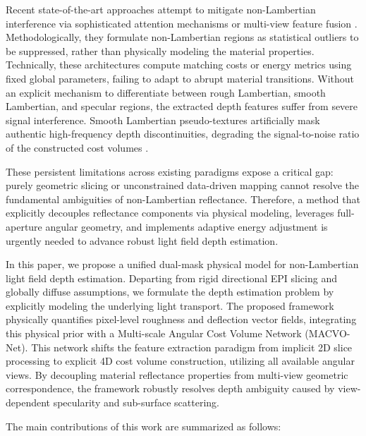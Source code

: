 \documentclass[lettersize,journal]{IEEEtran}
\begin{document}
Recent state-of-the-art approaches attempt to mitigate non-Lambertian interference via sophisticated attention mechanisms or multi-view feature fusion \cite{li2021, peng2022}. Methodologically, they formulate non-Lambertian regions as statistical outliers to be suppressed, rather than physically modeling the material properties. Technically, these architectures compute matching costs or energy metrics using fixed global parameters, failing to adapt to abrupt material transitions. Without an explicit mechanism to differentiate between rough Lambertian, smooth Lambertian, and specular regions, the extracted depth features suffer from severe signal interference. Smooth Lambertian pseudo-textures artificially mask authentic high-frequency depth discontinuities, degrading the signal-to-noise ratio of the constructed cost volumes \cite{zhang2023}.

These persistent limitations across existing paradigms expose a critical gap: purely geometric slicing or unconstrained data-driven mapping cannot resolve the fundamental ambiguities of non-Lambertian reflectance. Therefore, a method that explicitly decouples reflectance components via physical modeling, leverages full-aperture angular geometry, and implements adaptive energy adjustment is urgently needed to advance robust light field depth estimation.

In this paper, we propose a unified dual-mask physical model for non-Lambertian light field depth estimation. Departing from rigid directional EPI slicing and globally diffuse assumptions, we formulate the depth estimation problem by explicitly modeling the underlying light transport. The proposed framework physically quantifies pixel-level roughness and deflection vector fields, integrating this physical prior with a Multi-scale Angular Cost Volume Network (MACVO-Net). This network shifts the feature extraction paradigm from implicit 2D slice processing to explicit 4D cost volume construction, utilizing all available angular views. By decoupling material reflectance properties from multi-view geometric correspondence, the framework robustly resolves depth ambiguity caused by view-dependent specularity and sub-surface scattering. 

The main contributions of this work are summarized as follows:
\end{document}
